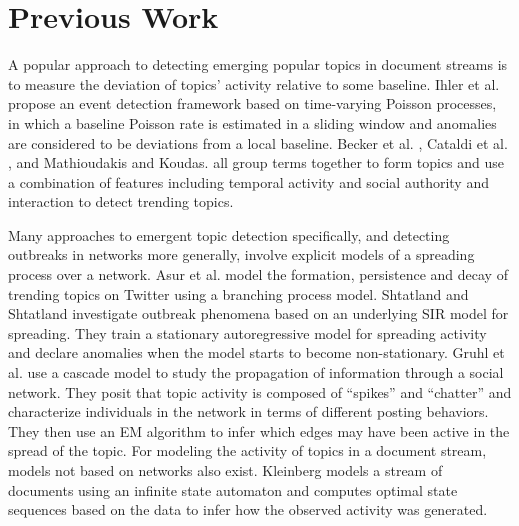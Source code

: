 
\section{Previous Work}


A popular approach to detecting emerging popular topics in document streams is
to measure the deviation of topics' activity relative to some baseline. Ihler et
al. \cite{Ihler} propose an event detection framework based on time-varying
Poisson processes, in which a baseline Poisson rate is estimated in a sliding
window and anomalies are considered to be deviations from a local
baseline. Becker et al. \cite{Becker}, Cataldi et al. \cite{Cataldi}, and
Mathioudakis and Koudas. \cite{Mathioudakis} all group terms together to form topics
and use a combination of features including temporal activity and social
authority and interaction to detect trending topics.

Many approaches to emergent topic detection specifically, and detecting
outbreaks in networks more generally, involve explicit models of a spreading
process over a network.  Asur et al. \cite{Asur} model the formation, persistence
and decay of trending topics on Twitter using a branching process
model. Shtatland and Shtatland \cite{Shtatland} investigate outbreak phenomena based on an
underlying SIR model for spreading. They train a stationary autoregressive model
for spreading activity and declare anomalies when the model starts to become
non-stationary. Gruhl et al. \cite{Gruhl} use a cascade model to study the propagation
of information through a social network. They posit that topic activity is
composed of ``spikes'' and ``chatter'' and characterize individuals in the
network in terms of different posting behaviors. They then use an EM algorithm
to infer which edges may have been active in the spread of the topic. For
modeling the activity of topics in a document stream, models not based on
networks also exist. Kleinberg \cite{Kleinberg} models a stream of documents using an
infinite state automaton and computes optimal state sequences based on the data
to infer how the observed activity was generated.

